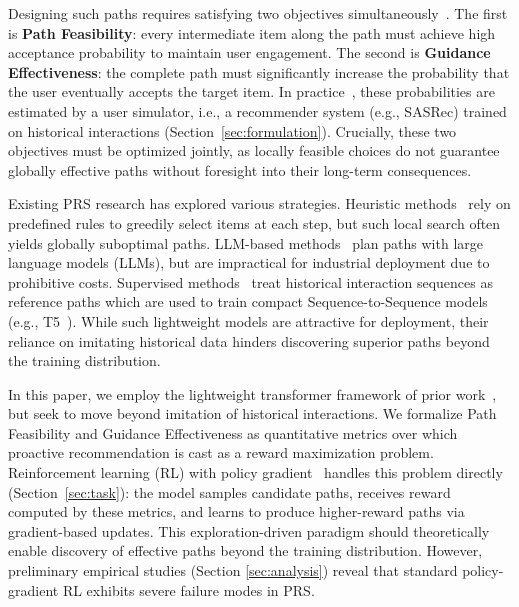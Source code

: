 Designing such paths requires satisfying two objectives simultaneously~\cite{bi2024proactive}. The first is \textbf{Path Feasibility}: every intermediate item along the path must achieve high acceptance probability to maintain user engagement. The second is \textbf{Guidance Effectiveness}: the complete path must significantly increase the probability that the user eventually accepts the target item. In practice~\cite{zhu2023influential, wang2025tunable}, these probabilities are estimated by a user simulator, i.e., a recommender system (e.g., SASRec) trained on historical interactions (Section~\ref{sec:formulation}). Crucially, these two objectives must be optimized jointly, as locally feasible choices do not guarantee globally effective paths without foresight into their long-term consequences.

Existing PRS research has explored various strategies. Heuristic methods~\cite{bi2024proactive,lian2025itmprec} rely on predefined rules to greedily select items at each step, but such local search often yields globally suboptimal paths. LLM-based methods~\cite{wang2025leveraging,wang2025tunable} plan paths with large language models (LLMs), but are impractical for industrial deployment due to prohibitive costs. Supervised methods~\cite{zhu2023influential} treat historical interaction sequences as reference paths which are used to train compact Sequence-to-Sequence models (e.g., T5~\cite{raffel2020exploring}). While such lightweight models are attractive for deployment, their reliance on imitating historical data hinders discovering superior paths beyond the training distribution.


In this paper, we employ the lightweight transformer framework of prior work~\cite{zhu2023influential}, but seek to move beyond imitation of historical interactions. We formalize Path Feasibility and Guidance Effectiveness as quantitative metrics over which proactive recommendation is cast as a reward maximization problem. Reinforcement learning (RL) with policy gradient~\cite{sutton1999policy,mei2026good} handles this problem directly (Section~\ref{sec:task}): the model samples candidate paths, receives reward computed by these metrics, and learns to produce higher-reward paths via gradient-based updates. This exploration-driven paradigm should theoretically enable discovery of effective paths beyond the training distribution. However, preliminary empirical studies (Section \ref{sec:analysis}) reveal that standard policy-gradient RL exhibits severe failure modes in PRS.

